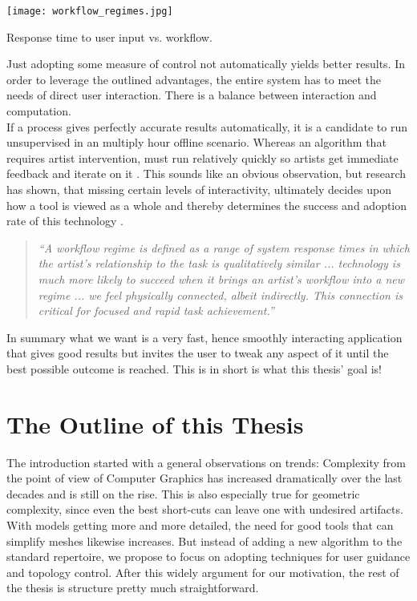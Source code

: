 \begin{floatingfigure}[r]{0.40\textwidth}
\centering
\texttt{[image: workflow\_regimes.jpg]}
\caption{Response time to user input vs. workflow.}
\label{fig:workflow_regimes}
\end{floatingfigure}
Just adopting some measure of control not automatically yields better results. 
In order to leverage the outlined advantages, the entire system has to meet the needs of direct user interaction.
There is a balance between interaction and computation.\\
If a process gives perfectly accurate results automatically, it is a candidate to run unsupervised in an multiply hour offline scenario.
Whereas an algorithm that requires artist intervention, must run relatively quickly so artists get immediate feedback and iterate on it \citep[cf.][p.20]{Hillman2010}.
This sounds like an obvious observation, but research has shown, that missing certain levels of interactivity, ultimately decides upon how a tool is viewed as a whole and thereby determines the success and adoption rate of this technology \citep[cf.][]{Enderton2011}.
\begin{quote} \textit{``A workflow regime is defined as a range of system response times in which the artist’s relationship to the task is qualitatively similar ... technology is much more likely to succeed when it brings an artist’s workflow into a new regime ... we feel physically connected, albeit indirectly. This connection is critical for focused and rapid task achievement.''} \citep[p.2]{Enderton2011} \end{quote}

In summary what we want is a very fast, hence smoothly interacting application that gives good results but invites the user to tweak any aspect of it until the best possible outcome is reached.
This is in short is what this thesis' goal is!\\

\section{The Outline of this Thesis}
\label{introduction5}

The introduction started with a general observations on trends:
Complexity from the point of view of Computer Graphics has increased dramatically over the last decades and is still on the rise.
This is also especially true for geometric complexity, since even the best short-cuts can leave one with undesired artifacts. 
With models getting more and more detailed, the need for good tools that can simplify meshes likewise increases. 
But instead of adding a new algorithm to the standard repertoire, we propose to focus on adopting techniques for user guidance and topology control.
After this widely argument for our motivation, the rest of the thesis is structure pretty much straightforward.

